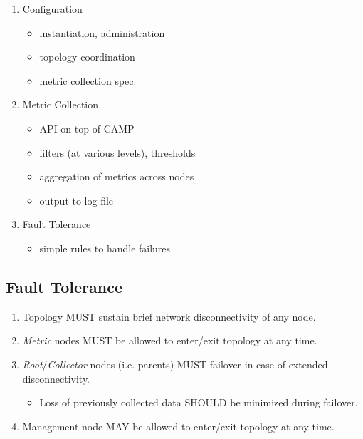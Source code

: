 \begin{enumerate}

\item Configuration
      \begin{itemize}
      \item instantiation, administration
      \item topology coordination
      \item metric collection spec.
      \end{itemize}

\item Metric Collection
      \begin{itemize}
      \item \dcamp API on top of CAMP
      \item filters (at various levels), thresholds
      \item aggregation of metrics across nodes
      \item output to log file
      \end{itemize}

\item Fault Tolerance
      \begin{itemize}
      \item simple rules to handle failures
      \end{itemize}

\end{enumerate}

\subsection{Fault Tolerance}

\begin{enumerate}

\item Topology MUST sustain brief network disconnectivity of any node.
\item \textit{Metric} nodes MUST be allowed to enter/exit topology at any time.
\item \textit{Root}/\textit{Collector} nodes (i.e. parents) MUST failover in case of extended disconnectivity.
      \begin{itemize}
      \item Loss of previously collected data SHOULD be minimized during failover.
      \end{itemize}
\item Management node MAY be allowed to enter/exit topology at any time.

\end{enumerate}

